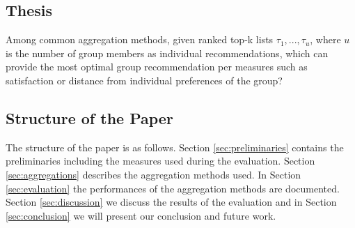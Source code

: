 \subsection{Thesis}

Among common aggregation methods, given ranked top-k lists $\tau_1, ... , \tau_u$, where $u$ is the number of group members as individual recommendations, which can provide the most optimal group recommendation per measures such as satisfaction or distance from individual preferences of the group?

\subsection{Structure of the Paper}
The structure of the paper is as follows. Section \ref{sec:preliminaries} contains the preliminaries including the measures used during the evaluation. Section \ref{sec:aggregations} describes the aggregation methods used. In Section \ref{sec:evaluation} the performances of the aggregation methods are documented. Section \ref{sec:discussion} we discuss the results of the evaluation and in Section \ref{sec:conclusion} we will present our conclusion and future work.